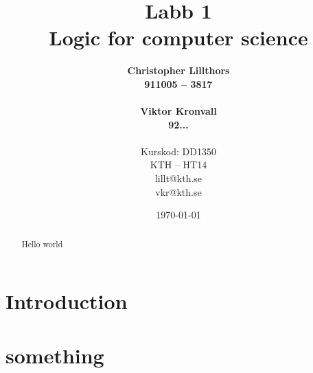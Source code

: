 \documentclass[a4paper,11pt]{article}
\title{Labb 1 \\ Logic for computer science}
\author{
  {\bf Christopher Lillthors}\\
  \textbf{911005 -- 3817} \\\\
  {\bf Viktor Kronvall}\\
  \textbf{92...}\\
  \\
  Kurskod: DD1350\\
  KTH -- HT14\\
  lillt@kth.se\\
  vkr@kth.se
}
\date{\today}
\begin{document}
\maketitle
\thispagestyle{empty}
\begin{abstract}
Hello world
\end{abstract}
\renewcommand{\arraystretch}{1.2}
\newpage
\thispagestyle{empty}
\tableofcontents
\newpage
\clearpage
\setcounter{page}{1}
\section{Introduction}
\newpage
\section{something}
\end{document}
